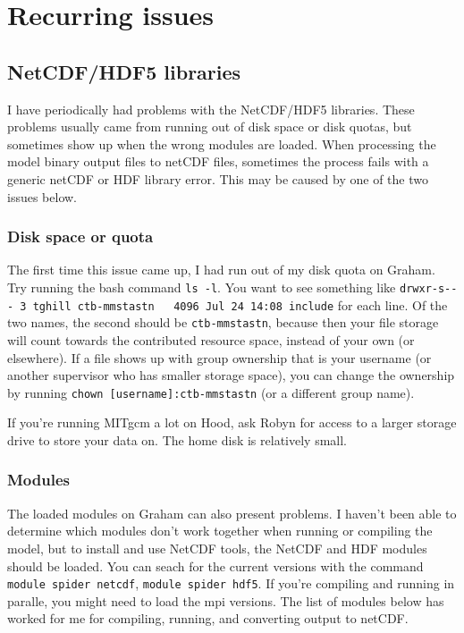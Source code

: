 \documentclass[11pt]{article}
\begin{document}
\section{Recurring issues}

\subsection{NetCDF/HDF5 libraries}
I have periodically had problems with the NetCDF/HDF5 libraries. These problems usually came from running out of disk space or disk quotas, but sometimes show up when the wrong modules are loaded. When processing the model binary output files to netCDF files, sometimes the process fails with a generic netCDF or HDF library error. This may be caused by one of the two issues below.

\subsubsection{Disk space or quota}
The first time this issue came up, I had run out of my disk quota on Graham. Try running the bash command \verb|ls -l|. You want to see something like \verb|drwxr-s--- 3 tghill ctb-mmstastn   4096 Jul 24 14:08 include| for each line. Of the two names, the second should be \verb|ctb-mmstastn|, because then your file storage will count towards the contributed resource space, instead of your own (or elsewhere). If a file shows up with group ownership that is your username (or another supervisor who has smaller storage space), you can change the ownership by running \verb|chown [username]:ctb-mmstastn| (or a different group name).

If you're running MITgcm a lot on Hood, ask Robyn for access to a larger storage drive to store your data on. The home disk is relatively small.

\subsubsection{Modules}
The loaded modules on Graham can also present problems. I haven't been able to determine which modules don't work together when running or compiling the model, but to install and use NetCDF tools, the NetCDF and HDF modules should be loaded. You can seach for the current versions with  the command \verb|module spider netcdf|, \verb|module spider hdf5|. If you're compiling and running in paralle, you might need to load the mpi versions. The list of modules below has worked for me for compiling, running, and converting output to netCDF.
\end{document}
